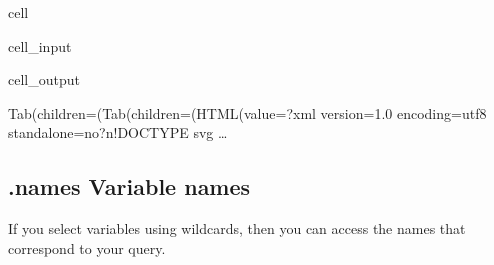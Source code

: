 \documentclass[letterpaper,10pt,english]{jupyterBook}
\begin{document}
\begin{sphinxuseclass}{cell}\begin{sphinxVerbatimInput}

\begin{sphinxuseclass}{cell_input}
\begin{sphinxVerbatim}[commandchars=\\\{\}]
\PYG{p}{[}\PYG{p}{]}
\end{sphinxVerbatim}

\end{sphinxuseclass}\end{sphinxVerbatimInput}
\begin{sphinxVerbatimOutput}

\begin{sphinxuseclass}{cell_output}
\begin{sphinxVerbatim}[commandchars=\\\{\}]
Tab(children=(Tab(children=(HTML(value=\PYGZsq{}\PYGZlt{}?xml version=\PYGZdq{}1.0\PYGZdq{} encoding=\PYGZdq{}utf\PYGZhy{}8\PYGZdq{} standalone=\PYGZdq{}no\PYGZdq{}?\PYGZgt{}\PYGZbs{}n\PYGZlt{}!DOCTYPE svg …
\end{sphinxVerbatim}

\end{sphinxuseclass}\end{sphinxVerbatimOutput}

\end{sphinxuseclass}

\subsection{.names Variable names}
\label{\detokenize{content/Python/modelflow_features:names-variable-names}}
\sphinxAtStartPar
If you select variables using wildcards, then you can access the names that correspond to your query.
\end{document}
